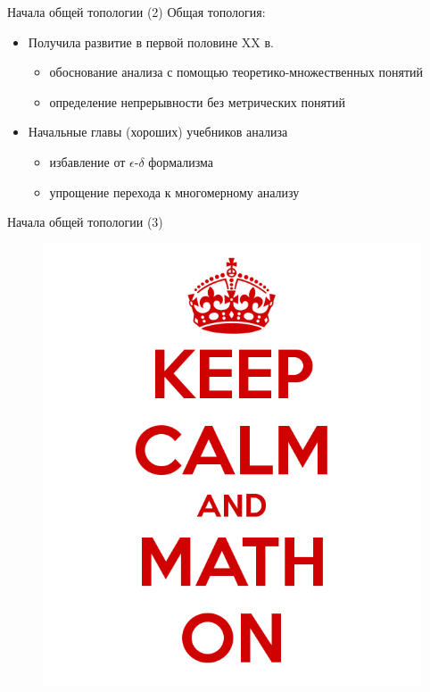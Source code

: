 \documentclass{beamer}
\begin{document}
\begin{frame}{Начала общей топологии (2)}
Общая топология:\\
\bigskip
\begin{itemize}
	\item Получила развитие в первой половине XX в.
		\begin{itemize}
			\item обоснование анализа с помощью теоретико-множественных понятий
			\item определение непрерывности без метрических понятий
		\end{itemize}
	\bigskip
	\item Начальные главы (хороших) учебников анализа
		\begin{itemize}
			\item избавление от $\epsilon$-$\delta$ формализма
			\item упрощение перехода к многомерному анализу
		\end{itemize}
\end{itemize}
\end{frame}

\begin{frame}{Начала общей топологии (3)}
\begin{center}
	\begin{figure}[H]
		\includegraphics[scale=0.3]{keep_calm.png} 
	\end{figure}
\end{center}
\end{frame}
\end{document}
